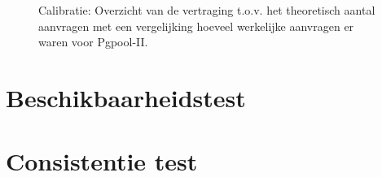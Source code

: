 \begin{figure}[h!] 
	\centering
	\caption{Calibratie: Overzicht van de vertraging t.o.v. het theoretisch aantal aanvragen met een vergelijking hoeveel werkelijke aanvragen er waren voor Pgpool-II. }
	\label{fig:calibratie-queriesperseconde-pgpool-ii}
\end{figure}

\section{Beschikbaarheidstest}


\section{Consistentie test}
